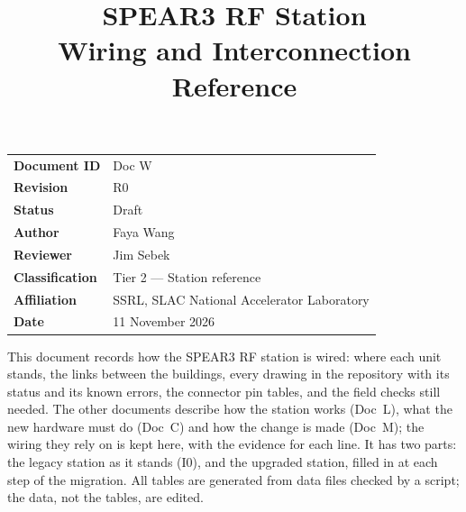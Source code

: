 \documentclass[letterpaper,11pt]{article}
\title{\vspace{-1.4cm}\bfseries SPEAR3 RF Station\\[2mm]
       \Large Wiring and Interconnection Reference}
\author{}
\date{}
\begin{document}
\maketitle
\thispagestyle{plain}

\begin{center}
\begin{minipage}{0.86\linewidth}\small
\begin{tabular}{@{}ll@{}}
\textbf{Document ID}    & Doc W \\
\textbf{Revision}       & R0 \\
\textbf{Status}         & Draft \\
\textbf{Author}         & Faya Wang \\
\textbf{Reviewer}       & Jim Sebek \\
\textbf{Classification} & Tier 2 --- Station reference \\
\textbf{Affiliation}    & SSRL, SLAC National Accelerator Laboratory \\
\textbf{Date}           & 11 November 2026 \\
\end{tabular}
\end{minipage}
\end{center}

\vspace{4mm}
\begin{keynote}
This document records how the SPEAR3 RF station is wired: where each unit stands, the
links between the buildings, every drawing in the repository with its status and its
known errors, the connector pin tables, and the field checks still needed. The other
documents describe how the station works (Doc~L), what the new hardware must do
(Doc~C) and how the change is made (Doc~M); the wiring they rely on is kept here,
with the evidence for each line. It has two parts: the legacy station as it stands
(I0), and the upgraded station, filled in at each step of the migration. All tables
are generated from data files checked by a script; the data, not the tables, are
edited.
\end{keynote}

\clearpage
\tableofcontents
\clearpage


\end{document}
